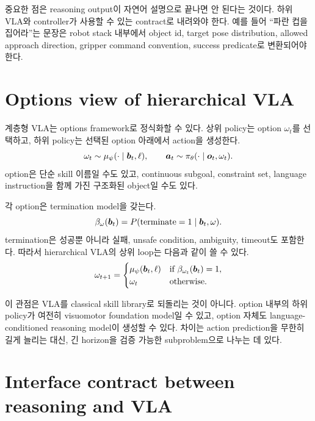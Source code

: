 중요한 점은 reasoning output이 자연어 설명으로 끝나면 안 된다는 것이다. 하위 VLA와 controller가 사용할 수 있는 contract로 내려와야 한다. 예를 들어 ``파란 컵을 집어라''는 문장은 robot stack 내부에서 object id, target pose distribution, allowed approach direction, gripper command convention, success predicate로 변환되어야 한다.

\section{Options view of hierarchical VLA}

계층형 VLA는 options framework로 정식화할 수 있다. 상위 policy는 option $\omega_t$를 선택하고, 하위 policy는 선택된 option 아래에서 action을 생성한다.
\begin{equation}
  \omega_t
  \sim
  \mu_{\psi}
  (\cdot \mid \bm{b}_t, \ell),
  \qquad
  \bm{a}_t
  \sim
  \pi_{\theta}
  (\cdot \mid \bm{o}_t, \omega_t).
  \label{eq:ch17-option-policy}
\end{equation}
option은 단순 skill 이름일 수도 있고, continuous subgoal, constraint set, language instruction을 함께 가진 구조화된 object일 수도 있다.

각 option은 termination model을 갖는다.
\begin{equation}
  \beta_{\omega}(\bm{b}_t)
  =
  P(\mathrm{terminate}=1 \mid \bm{b}_t,\omega).
  \label{eq:ch17-option-termination}
\end{equation}
termination은 성공뿐 아니라 실패, unsafe condition, ambiguity, timeout도 포함한다. 따라서 hierarchical VLA의 상위 loop는 다음과 같이 쓸 수 있다.
\begin{equation}
  \omega_{t+1}
  =
  \begin{cases}
  \mu_{\psi}(\bm{b}_t,\ell) & \text{if } \beta_{\omega_t}(\bm{b}_t)=1, \\
  \omega_t & \text{otherwise.}
  \end{cases}
  \label{eq:ch17-option-loop}
\end{equation}

이 관점은 VLA를 classical skill library로 되돌리는 것이 아니다. option 내부의 하위 policy가 여전히 visuomotor foundation model일 수 있고, option 자체도 language-conditioned reasoning model이 생성할 수 있다. 차이는 action prediction을 무한히 길게 늘리는 대신, 긴 horizon을 검증 가능한 subproblem으로 나누는 데 있다.

\section{Interface contract between reasoning and VLA}

